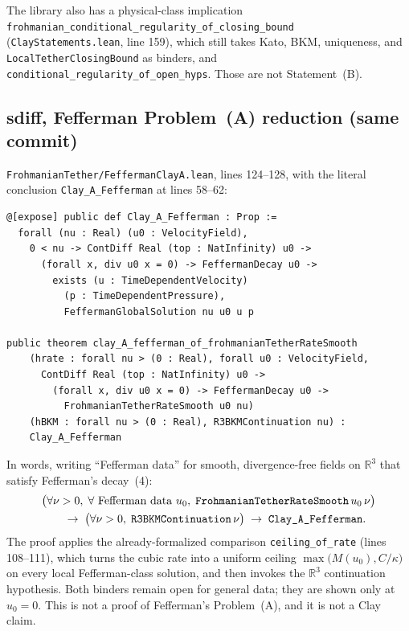 \documentclass[11pt]{article}
\theoremstyle{plain}
\theoremstyle{definition}
\theoremstyle{remark}
\newcommand{\R}{\mathbb{R}}
\begin{document}
The library also has a physical-class implication \texttt{frohmanian\_\hspace{0pt}conditional\_\hspace{0pt}regularity\_\hspace{0pt}of\_\hspace{0pt}closing\_\hspace{0pt}bound} (\texttt{ClayStatements.\hspace{0pt}lean}, line 159), which still takes Kato, BKM, uniqueness, and \texttt{LocalTetherClosingBound} as binders, and \texttt{conditional\_\hspace{0pt}regularity\_\hspace{0pt}of\_\hspace{0pt}open\_\hspace{0pt}hyps}. Those are not Statement~(B).

\subsection{sdiff, Fefferman Problem~(A) reduction (same commit)}
\label{sec:clay-a-reduction}

{\sloppy \texttt{FrohmanianTether/\hspace{0pt}FeffermanClayA.\hspace{0pt}lean}, lines 124--128, with the literal conclusion \texttt{Clay\_\hspace{0pt}A\_\hspace{0pt}Fefferman} at lines 58--62:}
\begin{lstlisting}
@[expose] public def Clay_A_Fefferman : Prop :=
  forall (nu : Real) (u0 : VelocityField),
    0 < nu -> ContDiff Real (top : NatInfinity) u0 ->
      (forall x, div u0 x = 0) -> FeffermanDecay u0 ->
        exists (u : TimeDependentVelocity)
          (p : TimeDependentPressure),
          FeffermanGlobalSolution nu u0 u p

public theorem clay_A_fefferman_of_frohmanianTetherRateSmooth
    (hrate : forall nu > (0 : Real), forall u0 : VelocityField,
      ContDiff Real (top : NatInfinity) u0 ->
        (forall x, div u0 x = 0) -> FeffermanDecay u0 ->
          FrohmanianTetherRateSmooth u0 nu)
    (hBKM : forall nu > (0 : Real), R3BKMContinuation nu) :
    Clay_A_Fefferman
\end{lstlisting}
In words, writing ``Fefferman data'' for smooth, divergence-free fields on \(\R^{3}\) that satisfy Fefferman's decay~(4):
\begin{align*}
&\bigl(\forall\nu>0,\;\forall\text{ Fefferman data }u_{0},\;
  \texttt{FrohmanianTether\allowbreak RateSmooth}\,u_{0}\,\nu\bigr) \\
&\qquad\to\;
\bigl(\forall\nu>0,\;\texttt{R3BKMContinuation}\,\nu\bigr)
\;\to\;
\texttt{Clay\_A\_Fefferman}.
\end{align*}
The proof applies the already-formalized comparison \texttt{ceiling\_of\_rate} (lines 108--111), which turns the cubic rate into a uniform ceiling \(\max\bigl(M(u_{0}),C/\kappa\bigr)\) on every local Fefferman-class solution, and then invokes the \(\R^{3}\) continuation hypothesis. Both binders remain open for general data; they are shown only at \(u_{0}=0\). This is not a proof of Fefferman's Problem~(A), and it is not a Clay claim.
\end{document}
